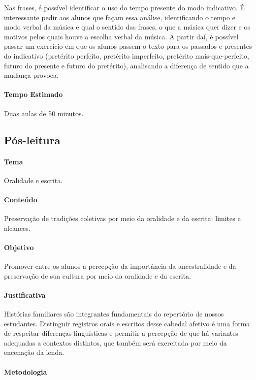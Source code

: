 \documentclass[11pt]{extarticle}
\begin{document}
Nas frases, é possível identificar o uso do tempo presente do modo indicativo. É interessante pedir aos alunos que façam essa análise, identificando o tempo e modo verbal da música e qual o sentido das frases, o que a música quer dizer e os motivos pelos quais houve a escolha verbal da música. A partir daí, é possível passar um exercício em que os alunos passem o texto para os passados e presentes do indicativo (pretérito perfeito, pretérito imperfeito, pretérito mais-que-perfeito, futuro do presente e futuro do pretérito), analisando a diferença de sentido que a mudança provoca. 

\paragraph{Tempo Estimado} Duas aulas de 50 minutos. 

\subsection{Pós-leitura}

\paragraph{Tema} Oralidade e escrita.

\paragraph{Conteúdo} Preservação de tradições coletivas por meio da oralidade e da escrita: limites e alcances. 

\paragraph{Objetivo} Promover entre os alunos a percepção da importância da ancestralidade e da preservação de sua cultura por meio da oralidade e da escrita.  

\paragraph{Justificativa} Histórias familiares são integrantes fundamentais do repertório de nossos estudantes. Distinguir registros orais e escritos desse cabedal afetivo é uma forma de respeitar diferenças linguísticas e permitir a percepção de que há variantes adequadas a contextos distintos, que também será exercitada por meio da encenação da lenda.      

\paragraph{Metodologia}
\end{document}
